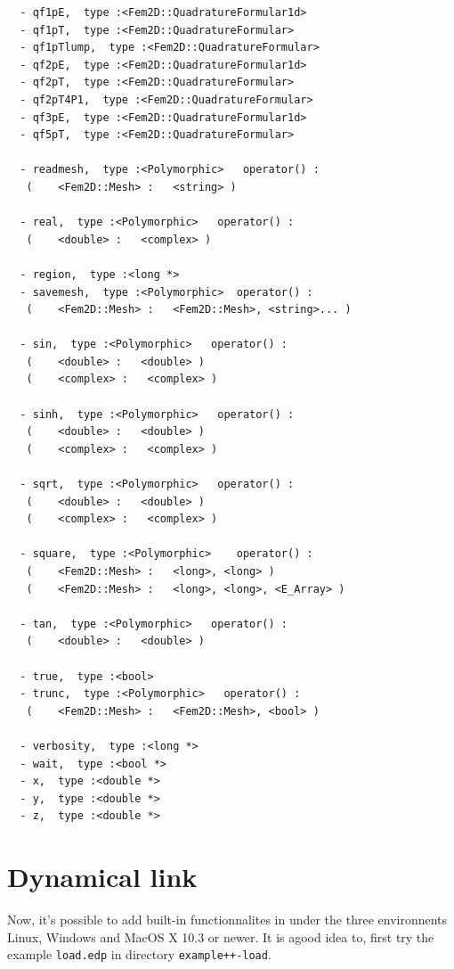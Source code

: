 \documentclass[a4paper,twoside,12pt]{book}
\begin{document}
{\begin{verbatim}
  - qf1pE,  type :<Fem2D::QuadratureFormular1d>
  - qf1pT,  type :<Fem2D::QuadratureFormular>
  - qf1pTlump,  type :<Fem2D::QuadratureFormular>
  - qf2pE,  type :<Fem2D::QuadratureFormular1d>
  - qf2pT,  type :<Fem2D::QuadratureFormular>
  - qf2pT4P1,  type :<Fem2D::QuadratureFormular>
  - qf3pE,  type :<Fem2D::QuadratureFormular1d>
  - qf5pT,  type :<Fem2D::QuadratureFormular>

  - readmesh,  type :<Polymorphic>   operator() :
   (    <Fem2D::Mesh> :   <string> )

  - real,  type :<Polymorphic>   operator() :
   (    <double> :   <complex> )

  - region,  type :<long *>
  - savemesh,  type :<Polymorphic>  operator() :
   (    <Fem2D::Mesh> :   <Fem2D::Mesh>, <string>... )

  - sin,  type :<Polymorphic>   operator() :
   (    <double> :   <double> )
   (    <complex> :   <complex> )

  - sinh,  type :<Polymorphic>   operator() :
   (    <double> :   <double> )
   (    <complex> :   <complex> )

  - sqrt,  type :<Polymorphic>   operator() :
   (    <double> :   <double> )
   (    <complex> :   <complex> )

  - square,  type :<Polymorphic>    operator() :
   (    <Fem2D::Mesh> :   <long>, <long> )
   (    <Fem2D::Mesh> :   <long>, <long>, <E_Array> )

  - tan,  type :<Polymorphic>   operator() :
   (    <double> :   <double> )

  - true,  type :<bool>
  - trunc,  type :<Polymorphic>   operator() :
   (    <Fem2D::Mesh> :   <Fem2D::Mesh>, <bool> )

  - verbosity,  type :<long *>
  - wait,  type :<bool *>
  - x,  type :<double *>
  - y,  type :<double *>
  - z,  type :<double *>
\end{verbatim}
}
\section{Dynamical link}
\label{Dynamical link}
Now, it's possible to add built-in functionnalites in \freefempp under the three
environnents Linux, Windows and MacOS X 10.3 or newer.
It is agood idea to,
first try the example \texttt{load.edp} in directory \texttt{example++-load}.
\end{document}
